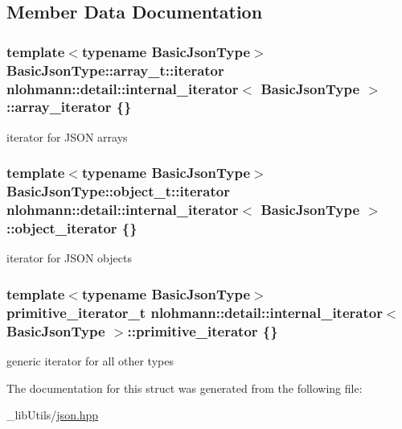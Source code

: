 \subsection{Member Data Documentation}
\subsubsection[{\texorpdfstring{array\+\_\+iterator}{array_iterator}}]{\setlength{\rightskip}{0pt plus 5cm}template$<$typename Basic\+Json\+Type$>$ Basic\+Json\+Type\+::array\+\_\+t\+::iterator {\bf nlohmann\+::detail\+::internal\+\_\+iterator}$<$ Basic\+Json\+Type $>$\+::array\+\_\+iterator \{\}}\hypertarget{structnlohmann_1_1detail_1_1internal__iterator_a8294a6e6f01b58e1cce8fbae66a50b5d}{}\label{structnlohmann_1_1detail_1_1internal__iterator_a8294a6e6f01b58e1cce8fbae66a50b5d}


iterator for J\+S\+ON arrays 

\subsubsection[{\texorpdfstring{object\+\_\+iterator}{object_iterator}}]{\setlength{\rightskip}{0pt plus 5cm}template$<$typename Basic\+Json\+Type$>$ Basic\+Json\+Type\+::object\+\_\+t\+::iterator {\bf nlohmann\+::detail\+::internal\+\_\+iterator}$<$ Basic\+Json\+Type $>$\+::object\+\_\+iterator \{\}}\hypertarget{structnlohmann_1_1detail_1_1internal__iterator_a8cb0af3498061426c1d0a65ad6220408}{}\label{structnlohmann_1_1detail_1_1internal__iterator_a8cb0af3498061426c1d0a65ad6220408}


iterator for J\+S\+ON objects 

\subsubsection[{\texorpdfstring{primitive\+\_\+iterator}{primitive_iterator}}]{\setlength{\rightskip}{0pt plus 5cm}template$<$typename Basic\+Json\+Type$>$ {\bf primitive\+\_\+iterator\+\_\+t} {\bf nlohmann\+::detail\+::internal\+\_\+iterator}$<$ Basic\+Json\+Type $>$\+::primitive\+\_\+iterator \{\}}\hypertarget{structnlohmann_1_1detail_1_1internal__iterator_a2b3bb45f968210e42c282017eeeb63a8}{}\label{structnlohmann_1_1detail_1_1internal__iterator_a2b3bb45f968210e42c282017eeeb63a8}


generic iterator for all other types 



The documentation for this struct was generated from the following file\+:\begin{DoxyCompactItemize}
\item 
\+\_\+lib\+Utils/\hyperlink{json_8hpp}{json.\+hpp}\end{DoxyCompactItemize}
